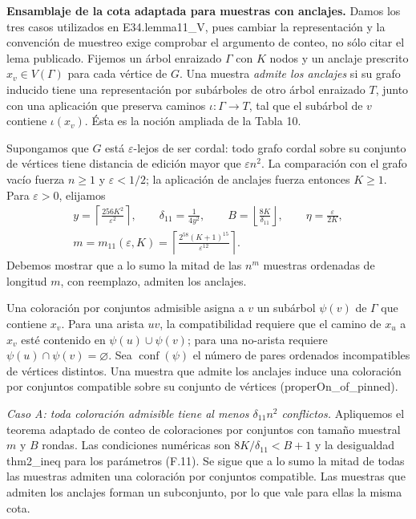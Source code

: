 \documentclass[spanish,11pt,a4paper]{article}
\begin{document}
\textbf{Ensamblaje de la cota adaptada para muestras con anclajes.} Damos los tres casos utilizados en {\ttfamily\small E34.\discretionary{\hbox{\ensuremath{\hookrightarrow}}}{}{}lemma11\_\discretionary{\hbox{\ensuremath{\hookrightarrow}}}{}{}V}, pues cambiar la representación y la convención de muestreo exige comprobar el argumento de conteo, no sólo citar el lema publicado. Fijemos un árbol enraizado \(\Gamma\) con \(K\) nodos y un anclaje prescrito \(x_v\in V(\Gamma)\) para cada vértice de \(G\). Una muestra \emph{admite los anclajes} si su grafo inducido tiene una representación por subárboles de otro árbol enraizado \(T\), junto con una aplicación que preserva caminos \(\iota:\Gamma\to T\), tal que el subárbol de \(v\) contiene \(\iota(x_v)\). Ésta es la noción ampliada de la Tabla 10.

Supongamos que \(G\) está \(\varepsilon\)-lejos de ser cordal: todo grafo cordal sobre su conjunto de vértices tiene distancia de edición mayor que \(\varepsilon n^2\). La comparación con el grafo vacío fuerza \(n\ge1\) y \(\varepsilon<1/2\); la aplicación de anclajes fuerza entonces \(K\ge1\). Para \(\varepsilon>0\), elijamos \[
\begin{gathered}
y=\left\lceil\frac{256K^2}{\varepsilon^2}\right\rceil,\qquad
\delta_{11}=\frac1{4y^2},\qquad
B=\left\lfloor\frac{8K}{\delta_{11}}\right\rfloor,\qquad
\eta=\frac{\varepsilon}{2K},\\
m=m_{11}(\varepsilon,K)
 =\left\lceil\frac{2^{58}(K+1)^{15}}{\varepsilon^{12}}\right\rceil.
\end{gathered}
\tag{F.11}
\] Debemos mostrar que a lo sumo la mitad de las \(n^m\) muestras ordenadas de longitud \(m\), con reemplazo, admiten los anclajes.

Una coloración por conjuntos admisible asigna a \(v\) un subárbol \(\psi(v)\) de \(\Gamma\) que contiene \(x_v\). Para una arista \(uv\), la compatibilidad requiere que el camino de \(x_u\) a \(x_v\) esté contenido en \(\psi(u)\cup\psi(v)\); para una no-arista requiere \(\psi(u)\cap\psi(v)=\varnothing\). Sea \(\operatorname{conf}(\psi)\) el número de pares ordenados incompatibles de vértices distintos. Una muestra que admite los anclajes induce una coloración por conjuntos compatible sobre su conjunto de vértices ({\ttfamily\small properOn\_\discretionary{\hbox{\ensuremath{\hookrightarrow}}}{}{}of\_\discretionary{\hbox{\ensuremath{\hookrightarrow}}}{}{}pinned}).

\emph{Caso A: toda coloración admisible tiene al menos \(\delta_{11}n^2\) conflictos.} Apliquemos el teorema adaptado de conteo de coloraciones por conjuntos con tamaño muestral \(m\) y \(B\) rondas. Las condiciones numéricas son \(8K/\delta_{11}<B+1\) y la desigualdad {\ttfamily\small thm2\_\discretionary{\hbox{\ensuremath{\hookrightarrow}}}{}{}ineq} para los parámetros (F.11). Se sigue que a lo sumo la mitad de todas las muestras admiten una coloración por conjuntos compatible. Las muestras que admiten los anclajes forman un subconjunto, por lo que vale para ellas la misma cota.
\end{document}
